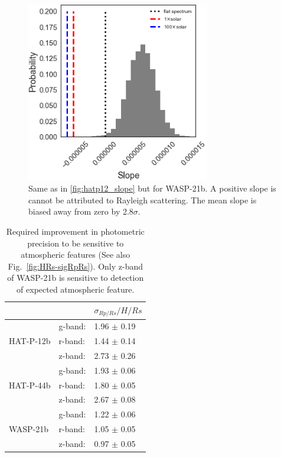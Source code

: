 \begin{figure}
\centering
	\includegraphics[width=8cm]{wasp21/slope.png}
    \caption{Same as in \ref{fig:hatp12_slope} but for WASP-21b. A positive slope is cannot be attributed to Rayleigh scattering. The mean slope is biased away from zero by 2.8$\sigma$.
    }\label{fig:wasp21_slope}
\end{figure}

\begin{table}
\centering
\caption{Required improvement in photometric precision to be sensitive to atmospheric features (See also Fig.~\ref{fig:HRs-sigRpRs}). Only z-band of WASP-21b is sensitive to detection of expected atmospheric feature.}
\begin{tabular}{lll}
\label{tab:H/u}
                  & & $\sigma_{Rp/Rs}/H/Rs$ \\ \hline                     
 \multirow{3}{*}{HAT-P-12b}& g-band:& 1.96 $\pm$ 0.19  \\
                           & r-band:& 1.44 $\pm$ 0.14  \\
                           & z-band:& 2.73 $\pm$ 0.26  \\ \hline
 \multirow{3}{*}{HAT-P-44b}& g-band:& 1.93 $\pm$ 0.06  \\
                           & r-band:& 1.80 $\pm$ 0.05  \\
                           & z-band:& 2.67 $\pm$ 0.08  \\ \hline
 \multirow{3}{*}{WASP-21b} & g-band:& 1.22 $\pm$ 0.06  \\
                           & r-band:& 1.05 $\pm$ 0.05   \\
                           & z-band:& 0.97 $\pm$ 0.05  \\
\hline
\end{tabular}
\end{table}


